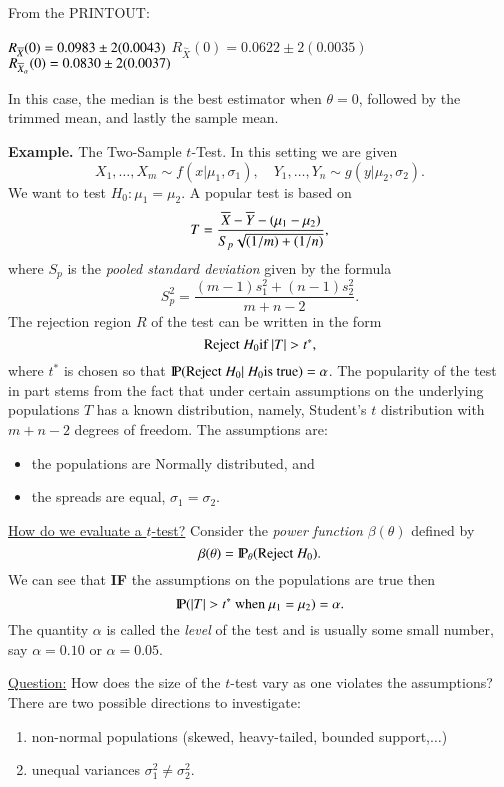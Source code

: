 \documentclass[captions=tableheading]{scrbook}
\begin{document}
From the PRINTOUT:

$R_{\Xbar}(0)=0.0983\pm2(0.0043)$
$R_{\overset{\sim}{X}}(0)=0.0622\pm2(0.0035)$
$R_{\Xbar_{\alpha}}(0)=0.0830\pm2(0.0037)$

In this case, the median is the best estimator when $\theta=0$, followed by the trimmed mean, and lastly the sample mean.  

\textbf{Example.} The Two-Sample $t$-Test.
In this setting we are given 
\[
X_{1},\ldots,X_{m}\sim f(x|\mu_{1},\sigma_{1}),\quad Y_{1},\ldots,Y_{n}\sim g(y|\mu_{2},\sigma_{2}).
\]
We want to test $H_{0}:\mu_{1}=\mu_{2}$. A popular test is based on 
\[
T=\frac{\Xbar-\overline{Y}-(\mu_{1}-\mu_{2})}{S_{p}\sqrt{(1/m)+(1/n)}},
\]
where $S_{p}$ is the \emph{pooled standard deviation} given by the
formula 
\[
S_{p}^{2}=\frac{(m-1)s_{1}^{2}+(n-1)s_{2}^{2}}{m+n-2}.
\]
 The rejection region $R$ of the test can be written in the form
\[
\mbox{Reject \ensuremath{H_{0}}if \ensuremath{|T|>t^{\ast}}},
\]
where $t^{\ast}$ is chosen so that $\P(\mbox{Reject \ensuremath{H_{0}}}|\mbox{ \ensuremath{H_{0}}is true})=\alpha$. The popularity of the test in part stems from the fact that under certain assumptions on the underlying populations $T$ has a known distribution, namely, Student's $t$ distribution with $m+n-2$ degrees of freedom. The assumptions are:

\begin{itemize}
\item the populations are Normally distributed, and
\item the spreads are equal, $\sigma_{1}=\sigma_{2}$.
\end{itemize}

\underline{How do we evaluate a $t$-test?} Consider the \emph{power function} $\beta(\theta)$ defined by 
\[
\beta(\theta)=\P_{\theta}(\mbox{Reject \ensuremath{H_{0}}}).
\]
 We can see that \textbf{IF} the assumptions on the populations are true then 
\[
\P(|T|>t^{\ast}\mbox{ when \ensuremath{\mu_{1}=\mu_{2}}})=\alpha.
\]
The quantity $\alpha$ is called the \emph{level} of the test and is usually some small number, say $\alpha=0.10$ or $\alpha=0.05$.

\underline{Question:} How does the size of the $t$-test vary as one violates the assumptions? There are two possible directions to investigate:


\begin{enumerate}
\item non-normal populations (skewed, heavy-tailed, bounded support,$\ldots$)
\item unequal variances $\sigma_{1}^{2}\neq\sigma_{2}^{2}$.
\end{enumerate}
\end{document}
